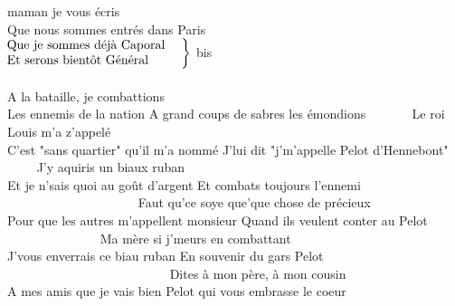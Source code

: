 
 maman je vous écris
\\Que nous sommes entrés dans Paris
\\$\left.\begin{tabular}{l}
\hspace{-0.4cm}
Que je sommes déjà Caporal
\\
\hspace{-0.4cm}
Et serons bientôt Général ~~~~~
\end{tabular}\right\rbrace$ bis
\\\\A la bataille, je combattions 
\\Les ennemis de la nation 
{A grand coups de sabres les émondions ~~~~~~}
Le roi Louis m'a z'appelé
\\C'est "sans quartier" qu'il m'a nommé
{J'lui dit "j'm'appelle Pelot d'Hennebont" ~~~~}
J'y aquiris un biaux ruban
\\Et je n'sais quoi au goût d'argent
{Et combats toujours l'ennemi ~~~~~~~~~~~~~~~~~~~~}
Faut qu'ce soye que'que chose de précieux
\\Pour que les autres m'appellent monsieur
{Quand ils veulent conter au Pelot ~~~~~~~~~~~~~~}
Ma mère si j'meurs en combattant
\\J'vous enverrais ce biau ruban
{En souvenir du gars Pelot ~~~~~~~~~~~~~~~~~~~~~~~~~}
Dites à mon père, à mon cousin
\\A mes amis que je vais bien
{Pelot qui vous embrasse le coeur ~~~~~~~~~~~~~~~~}
\breakpage